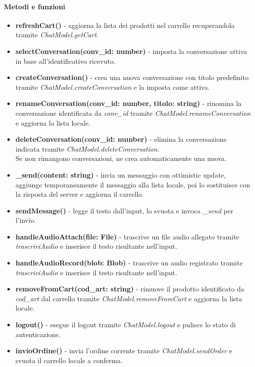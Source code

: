 \paragraph{Metodi e funzioni}
\begin{itemize}
	\item \textbf{refreshCart()} - aggiorna la lista dei prodotti nel carrello recuperandola tramite \textit{ChatModel.getCart}.
	\item \textbf{selectConversation(conv\_id: number)} - imposta la conversazione attiva in base all'identificativo ricevuto.
	\item \textbf{createConversation()} - crea una nuova conversazione con titolo predefinito tramite \textit{ChatModel.createConversation} e la imposta come attiva.
	\item \textbf{renameConversation(conv\_id: number, titolo: string)} - rinomina la conversazione identificata da \textit{conv\_id} tramite \textit{ChatModel.renameConversation} e aggiorna la lista locale.
	\item \textbf{deleteConversation(conv\_id: number)} - elimina la conversazione indicata tramite \textit{ChatModel.deleteConversation}.\\
	Se non rimangono conversazioni, ne crea automaticamente una nuova.
	\item \textbf{\_send(content: string)} - invia un messaggio con ottimistic update, aggiunge temporaneamente il messaggio alla lista locale, poi lo sostituisce con la risposta del server e aggiorna il carrello.
	\item \textbf{sendMessage()} - legge il testo dall'input, lo svuota e invoca \textit{\_send} per l'invio.
	\item \textbf{handleAudioAttach(file: File)} - trascrive un file audio allegato tramite \textit{trascriviAudio} e inserisce il testo risultante nell'input.
	\item \textbf{handleAudioRecord(blob: Blob)} - trascrive un audio registrato tramite \textit{trascriviAudio} e inserisce il testo risultante nell'input.
	\item \textbf{removeFromCart(cod\_art: string)} - rimuove il prodotto identificato da \textit{cod\_art} dal carrello tramite \textit{ChatModel.removeFromCart} e aggiorna la lista locale.
	\item \textbf{logout()} - esegue il logout tramite \textit{ChatModel.logout} e pulisce lo stato di autenticazione.
	\item \textbf{invioOrdine()} - invia l'ordine corrente tramite \textit{ChatModel.sendOrder} e svuota il carrello locale a conferma.
\end{itemize}

